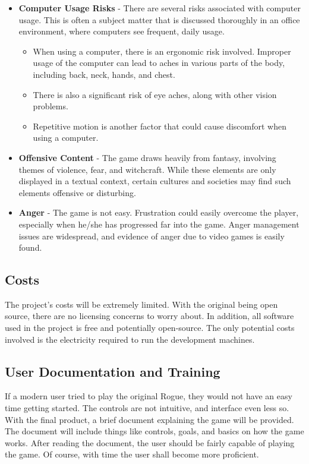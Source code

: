 \documentclass[12pt, titlepage]{article}
\begin{document}
	\begin{itemize}
		\item \textbf{Computer Usage Risks} - There are several risks associated with computer usage. This is often a subject matter that is discussed thoroughly in an office environment, where computers see frequent, daily usage.
		\begin{itemize}
			\item When using a computer, there is an ergonomic risk involved. Improper usage of the computer can lead to aches in various parts of the body, including back, neck, hands, and chest.
			\item There is also a significant risk of eye aches, along with other vision problems.
			\item Repetitive motion is another factor that could cause discomfort when using a computer.
		\end{itemize}
		\item \textbf{Offensive Content} - The game draws heavily from fantasy, involving themes of violence, fear, and witchcraft. While these elements are only displayed in a textual context, certain cultures and societies may find such elements offensive or disturbing.
		\item \textbf{Anger} - The game is not easy. Frustration could easily overcome the player, especially when he/she has progressed far into the game. Anger management issues are widespread, and evidence of anger due to video games is easily found.
	\end{itemize}

	\subsection{Costs}

	The project's costs will be extremely limited. With the original being open source, there are no licensing concerns to worry about. In addition, all software used in the project is free and potentially open-source. The only potential costs involved is the electricity required to run the development machines.

	\subsection{User Documentation and Training}

	If a modern user tried to play the original Rogue, they would not have an easy time getting started. The controls are not intuitive, and interface even less so. With the final product, a brief document explaining the game will be provided. The document will include things like controls, goals, and basics on how the game works. After reading the document, the user should be fairly capable of playing the game. Of course, with time the user shall become more proficient.
\end{document}
